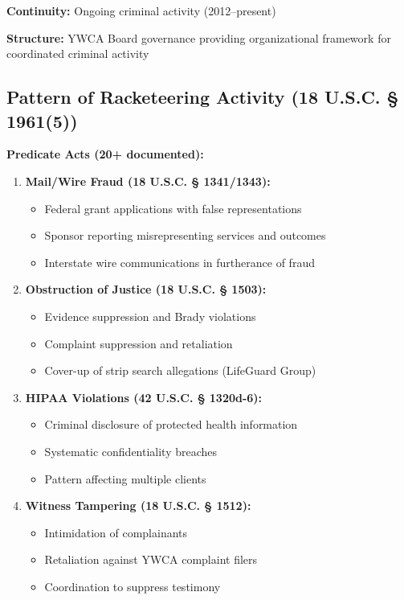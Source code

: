 \documentclass[12pt,oneside]{article}
\begin{document}
\begin{flushleft}
\textbf{Continuity:} Ongoing criminal activity (2012--present)

\textbf{Structure:} YWCA Board governance providing organizational framework for coordinated criminal activity

\subsection*{Pattern of Racketeering Activity (18 U.S.C. § 1961(5))}

\textbf{Predicate Acts (20+ documented):}

\begin{enumerate}
\item \textbf{Mail/Wire Fraud (18 U.S.C. § 1341/1343):}
\begin{itemize}
\item Federal grant applications with false representations
\item Sponsor reporting misrepresenting services and outcomes
\item Interstate wire communications in furtherance of fraud
\end{itemize}

\item \textbf{Obstruction of Justice (18 U.S.C. § 1503):}
\begin{itemize}
\item Evidence suppression and Brady violations
\item Complaint suppression and retaliation
\item Cover-up of strip search allegations (LifeGuard Group)
\end{itemize}

\item \textbf{HIPAA Violations (42 U.S.C. § 1320d-6):}
\begin{itemize}
\item Criminal disclosure of protected health information
\item Systematic confidentiality breaches
\item Pattern affecting multiple clients
\end{itemize}

\item \textbf{Witness Tampering (18 U.S.C. § 1512):}
\begin{itemize}
\item Intimidation of complainants
\item Retaliation against YWCA complaint filers
\item Coordination to suppress testimony
\end{itemize}


\end{enumerate}
\end{flushleft}
\end{document}
